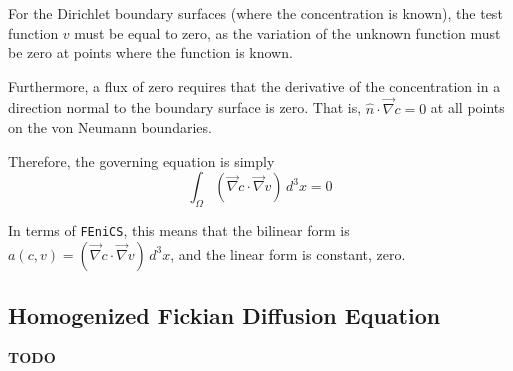 \documentclass{article}
\begin{document}
For the Dirichlet boundary surfaces (where the concentration is known),
the test function $v$ must be equal to zero,
as the variation of the unknown function must be zero at points where the function is known.

Furthermore, a flux of zero requires that the derivative of the concentration in a direction
normal to the boundary surface is zero.
That is, $\hat{n} \cdot \vec{\nabla} c = 0$ at all points on the von Neumann boundaries.

Therefore, the governing equation is simply
$$\int_{\Omega} \left( \vec{\nabla}c \cdot \vec{\nabla}v \right) \,d^3x = 0$$

In terms of \texttt{FEniCS}, this means that the bilinear form is
$a(c,v)=\left( \vec{\nabla}c \cdot \vec{\nabla}v \right) \,d^3x$,
and the linear form is constant, zero.

\subsection{Homogenized Fickian Diffusion Equation}\label{subsec:hom_fick}

\textbf{TODO}
\end{document}
